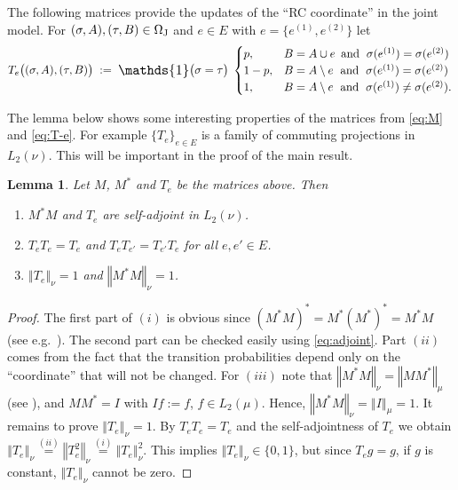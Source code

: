 \documentclass{dis}
\newtheorem{lemma}[theorem]{Lemma}
\theoremstyle{citing}
\begin{document}
The following matrices provide the updates of the 
``RC coordinate'' in the joint model. 
For $(\sigma,A),(\tau,B)\in{\Omega}_{\rm J}$ and $e\in E$ with 
$e=\{e^{(1)},e^{(2)}\}$ let
\begin{equation} \label{eq:T-e}
T_e\bigl((\sigma,A),(\tau,B)\bigr) \;:=\; {\scalebox{1.2}{\raisebox{-0.2mm}{$\mathds{1}$}}}\bigl(\sigma=\tau\bigr)\;
	\begin{cases}
	p, & B=A\cup e  \,\text{ and }\;  \sigma(e^{(1)})=\sigma(e^{(2)})\\
	1-p, & B=A\setminus e  \;\text{ and }\;  \sigma(e^{(1)})=\sigma(e^{(2)})\\
	1, & B=A\setminus e  \;\text{ and }\;  \sigma(e^{(1)})\ne\sigma(e^{(2)}).
	\end{cases}
\end{equation}

The lemma below
shows some interesting properties of the matrices from \eqref{eq:M} and 
\eqref{eq:T-e}. For example $\{T_e\}_{e\in E}$ is a family of commuting 
projections in $L_2(\nu)$. This will be important in the proof of 
the main result.

\begin{lemma} \label{lemma:repr-prop}
Let $M$, $M^*$ and $T_e$ be the matrices above.
Then 
\begin{enumerate}
	
	\item $M^*M$ and $T_e$ are self-adjoint in $L_2(\nu)$.
\vspace{1mm}
	\item $T_e T_e = T_e$ and $T_e T_{e'} = T_{e'} T_e$ 
				for all $e,e'\in E$.
\vspace{1mm}
	\item ${\left\Vert {T_{e}} \right\Vert}_{\nu}=1$ and ${\left\Vert {M^*M} \right\Vert}_{\nu}=1$.
\end{enumerate}
\end{lemma}

\begin{proof}
The first part of $(i)$ is obvious since 
$(M^*M)^*=M^* (M^*)^*=M^*M$ (see e.g.~\cite[Thm.~3.9-4]{Krey}). 
The second part can be checked easily using \eqref{eq:adjoint}. 
Part $(ii)$ comes from the fact that the transition 
probabilities depend only on the ``coordinate'' that will not 
be changed. 
For $(iii)$ note that ${\left\Vert {M^*M} \right\Vert}_{\nu}={\left\Vert {M M^*} \right\Vert}_{\mu}$ 
(see \cite[Thm.~3.9-4]{Krey}), and $M M^*=I$ with $If:=f$, 
$f\in L_2(\mu)$. Hence, ${\left\Vert {M^*M} \right\Vert}_{\nu}={\left\Vert {I} \right\Vert}_{\mu}=1$.
It remains to prove ${\left\Vert {T_{e}} \right\Vert}_{\nu}=1$. 
By $T_e T_e = T_e$ and the self-adjointness of $T_e$ 
we obtain 
${\left\Vert {T_{e}} \right\Vert}_{\nu} \stackrel{(ii)}{=} {\left\Vert {T_{e}^2} \right\Vert}_{\nu} 
\stackrel{(i)}{=} {\left\Vert {T_{e}} \right\Vert}_{\nu}^2$. 
This implies ${\left\Vert {T_{e}} \right\Vert}_{\nu}\in\{0,1\}$, but since 
$T_e g = g$, if $g$ is constant, ${\left\Vert {T_{e}} \right\Vert}_{\nu}$ 
cannot be zero.
\end{proof}
\end{document}
